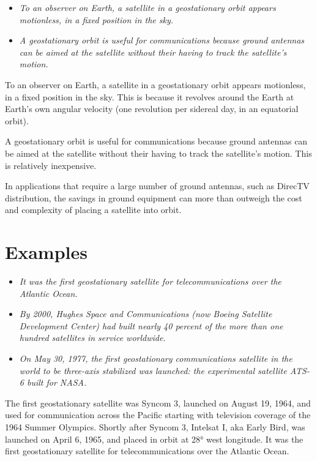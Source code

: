 \begin{itemize}
\item
  \emph{To an observer on Earth, a satellite in a geostationary orbit
  appears motionless, in a fixed position in the sky.}
\item
  \emph{A geostationary orbit is useful for communications because
  ground antennas can be aimed at the satellite without their having to
  track the satellite's motion.}
\end{itemize}

To an observer on Earth, a satellite in a geostationary orbit appears
motionless, in a fixed position in the sky. This is because it revolves
around the Earth at Earth's own angular velocity (one revolution per
sidereal day, in an equatorial orbit).

A geostationary orbit is useful for communications because ground
antennas can be aimed at the satellite without their having to track the
satellite's motion. This is relatively inexpensive.

In applications that require a large number of ground antennas, such as
DirecTV distribution, the savings in ground equipment can more than
outweigh the cost and complexity of placing a satellite into orbit.

\section{Examples}\label{examples}

\begin{itemize}
\item
  \emph{It was the first geostationary satellite for telecommunications
  over the Atlantic Ocean.}
\item
  \emph{By 2000, Hughes Space and Communications (now Boeing Satellite
  Development Center) had built nearly 40 percent of the more than one
  hundred satellites in service worldwide.}
\item
  \emph{On May 30, 1977, the first geostationary communications
  satellite in the world to be three-axis stabilized was launched: the
  experimental satellite ATS-6 built for NASA.}
\end{itemize}

The first geostationary satellite was Syncom 3, launched on August 19,
1964, and used for communication across the Pacific starting with
television coverage of the 1964 Summer Olympics. Shortly after Syncom 3,
Intelsat I, aka Early Bird, was launched on April 6, 1965, and placed in
orbit at 28° west longitude. It was the first geostationary satellite
for telecommunications over the Atlantic Ocean.

